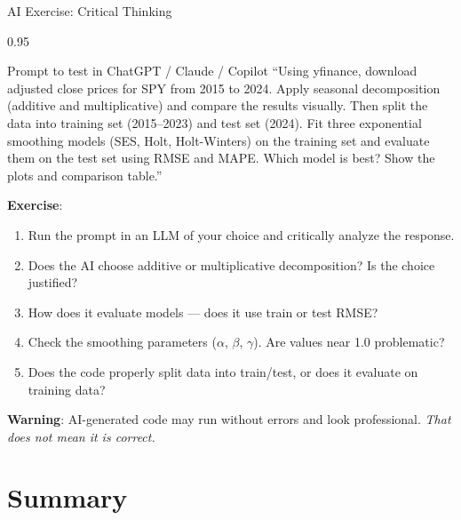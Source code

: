 \documentclass[9pt, aspectratio=169, t]{beamer}
\begin{document}
\begin{frame}{AI Exercise: Critical Thinking}
    \begin{cminipage}{0.95\textwidth}
    \vspace{-0.3cm}
    \begin{block}{\footnotesize Prompt to test in ChatGPT / Claude / Copilot}
        {\footnotesize
        ``Using yfinance, download adjusted close prices for SPY from 2015 to 2024. Apply seasonal decomposition (additive and multiplicative) and compare the results visually. Then split the data into training set (2015--2023) and test set (2024). Fit three exponential smoothing models (SES, Holt, Holt-Winters) on the training set and evaluate them on the test set using RMSE and MAPE. Which model is best? Show the plots and comparison table.''
        }
    \end{block}
    \vspace{-2mm}
    {\footnotesize
    \textbf{Exercise}:
    \begin{enumerate}\setlength{\itemsep}{0pt}
        \item Run the prompt in an LLM of your choice and critically analyze the response.
        \item Does the AI choose additive or multiplicative decomposition? Is the choice justified?
        \item How does it evaluate models --- does it use train or test RMSE?
        \item Check the smoothing parameters ($\alpha$, $\beta$, $\gamma$). Are values near 1.0 problematic?
        \item Does the code properly split data into train/test, or does it evaluate on training data?
    \end{enumerate}
    }
    \vspace{-2mm}
    \begin{alertblock}{}
        {\footnotesize \textbf{Warning}: AI-generated code may run without errors and look professional. \textit{That does not mean it is correct.}}
    \end{alertblock}
    \end{cminipage}
\end{frame}

\section{Summary}
\end{document}
